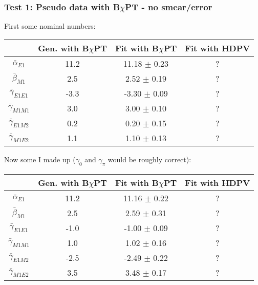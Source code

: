 \documentclass[]{article}
\begin{document}
\vspace{5mm}
\subsubsection{Test 1: Pseudo data with B$\chi$PT - no smear/error} \label{Sec:Pseudo1}

\noindent First some nominal numbers:
\begin{table}[h!]
	\centering %
	\begin{tabular}{|c|c|c|c|} %
		\hline %
		                      & Gen. with B$\chi$PT & Fit with B$\chi$PT & Fit with HDPV\\
		\hline\hline
		$\bar{\alpha}_{E1}$   & 11.2 & 11.18 $\pm$ 0.23 & ? \\
		$\bar{\beta}_{M1}$    & 2.5  & 2.52 $\pm$ 0.19 & ?\\
		$\bar{\gamma}_{E1E1}$ & -3.3 & -3.30 $\pm$ 0.09 & ? \\
		$\bar{\gamma}_{M1M1}$ & 3.0 & 3.00 $\pm$ 0.10 & ? \\
		$\bar{\gamma}_{E1M2}$ & 0.2  & 0.20 $\pm$ 0.15 & ?\\
		$\bar{\gamma}_{M1E2}$ & 1.1 & 1.10 $\pm$ 0.13 & ?\\[0.5ex]
		\hline
	\end{tabular}
\end{table}

\newpage
\noindent Now some I made up ($\gamma_{0}$ and $\gamma_{\pi}$ would be roughly correct):
\begin{table}[h!]
	\centering %
	\begin{tabular}{|c|c|c|c|} %
		\hline %
		& Gen. with B$\chi$PT & Fit with B$\chi$PT & Fit with HDPV\\
		\hline\hline
		$\bar{\alpha}_{E1}$   & 11.2 & 11.16 $\pm$ 0.22 & ? \\
		$\bar{\beta}_{M1}$    & 2.5  & 2.59 $\pm$ 0.31 & ?\\
		$\bar{\gamma}_{E1E1}$ & -1.0 & -1.00 $\pm$ 0.09 & ? \\
		$\bar{\gamma}_{M1M1}$ & 1.0 & 1.02 $\pm$ 0.16 & ? \\
		$\bar{\gamma}_{E1M2}$ & -2.5  & -2.49 $\pm$ 0.22 & ?\\
		$\bar{\gamma}_{M1E2}$ & 3.5 & 3.48 $\pm$ 0.17 & ?\\[0.5ex]
		\hline
	\end{tabular}
\end{table}
\end{document}
